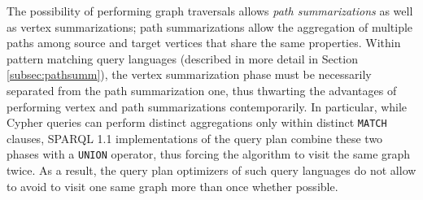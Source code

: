 The possibility of performing graph traversals allows \textit{path summarizations} as well as vertex summarizations; path summarizations  allow the aggregation of multiple paths  among source and target vertices that share the same properties. 
Within pattern matching query languages (described in more detail in Section \ref{subsec:pathsumm}),  the vertex summarization phase must be necessarily separated from the path summarization one, thus thwarting the advantages of performing vertex and path summarizations contemporarily. In particular, while Cypher queries can perform distinct aggregations only within distinct \texttt{MATCH} clauses, SPARQL 1.1 implementations of the query plan combine these two phases with a \texttt{UNION} operator, thus forcing the algorithm to visit the same graph twice. As a result, the query plan optimizers of such query languages do not allow to avoid to visit one same graph more than once whether possible.  

